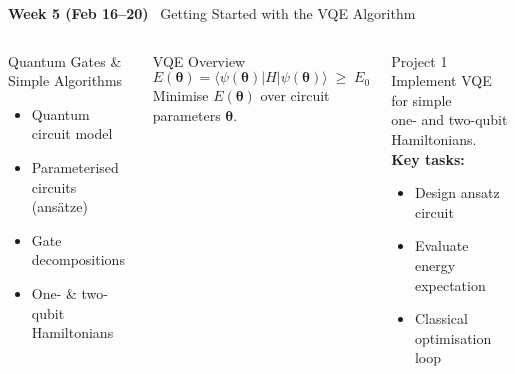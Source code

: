 \documentclass[aspectratio=169,12pt]{beamer}
\newcommand{\ket}[1]{|#1\rangle}
\newcommand{\bra}[1]{\langle#1|}
\newcommand{\week}[1]{\textcolor{qgold}{\textbf{#1}}}
\begin{document}
\begin{frame}{\week{Week 5 (Feb 16--20)} \ Getting Started with the VQE Algorithm}
  \begin{columns}[T]
      \begin{block}{Quantum Gates \& Simple Algorithms}
        \begin{itemize}
          \item Quantum circuit model
          \item Parameterised circuits (ansätze)
          \item Gate decompositions
          \item One- \& two-qubit Hamiltonians
        \end{itemize}
      \end{block}
      \vspace{4pt}
      \begin{block}{VQE Overview}
        \[
          E(\bm\theta) = \bra{\psi(\bm\theta)}H\ket{\psi(\bm\theta)}
          \;\geq\; E_0
        \]
        Minimise $E(\bm\theta)$ over circuit parameters $\bm\theta$.
      \end{block}
      \begin{alertblock}{Project 1}
        Implement VQE for simple\\
        one- and two-qubit Hamiltonians.\\[4pt]
        \textbf{Key tasks:}
        \begin{itemize}
          \item Design ansatz circuit
          \item Evaluate energy expectation
          \item Classical optimisation loop
        \end{itemize}
      \end{alertblock}
  \end{columns}
\end{frame}
\end{document}
